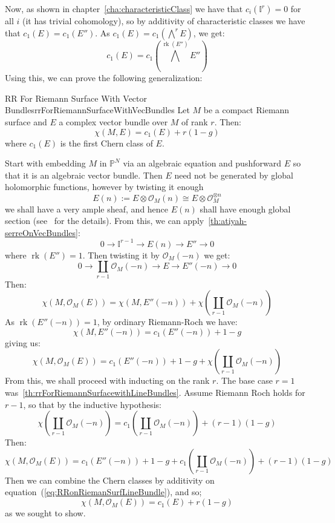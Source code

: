 \documentclass{ut-thesis}
\newenvironment{Proof}[1][]
  {\begin{ProofTcb}[#1]}
  {\end{ProofTcb}}
\newcommand{\BI}{{\mathbb{I}}}
\renewcommand{\P}{{\mathbb{P}}}
\newcommand{\CO}{{\mathcal{O}}}
\newcommand{\rk}{{\operatorname{rk}}}
\newcommand{\Dcup}{\coprod}
\begin{document}
Now, as shown in chapter~\ref{cha:characteristicClass} we have that $c_i(\BI^r) = 0$ for all $i$ (it has
trivial cohomology), so by additivity of
characteristic classes we have that $c_1(E) = c_1(E'')$. As $c_1(E) = c_1 \left(\bigwedge^r E\right)$, we get:
\[
  c_1(E) = c_1 \left(\bigwedge^{\rk(E'')}E''\right)
\]
Using this, we can prove the following generalization:

\begin{thm}{RR For Riemann Surface With Vector Bundles}{rrForRiemannSurfaceWithVecBundles}
  Let $M$ be a compact Riemann surface and $E$ a complex vector bundle over $M$ of rank $r$. Then:
  \[
    \chi(M, E) = c_1(E) + r(1-g)
  \]
  where $c_1(E)$ is the first Chern class of $E$.
\end{thm}

\begin{Proof}
  Start with embedding $M$ in $\P^N$ via an algebraic equation and pushforward $E$ so that it is an algebraic
  vector bundle. Then $E$ need not be generated by global holomorphic functions, however by twisting it enough
  \[
    E(n) := E\otimes \CO_M(n) \cong E\otimes \CO_M^{\otimes n}
  \]
  we shall have a very ample sheaf, and hence $E(n)$ shall have enough global section
  (see~\cite[section~4.4]{NateAlgGeo} for the details). From this, we can
  apply~\cref{th:atiyah-serreOnVecBundles}:
  \[
    0 \to \BI^{r-1} \to E(n) \to E'' \to 0
  \]
  where $\rk(E'') = 1$. Then twisting it by $\CO_M(-n)$ we get:
  \begin{equation}\label{eq:RRonRiemanSurfLineBundle}
    0 \to \Dcup_{r-1} \CO_M(-n) \to E \to E''(-n) \to 0
  \end{equation}
  Then:
  \[
    \chi(M, \CO_M(E)) = \chi(M, E''(-n)) + \chi \left( \Dcup_{r-1} \CO_M(-n)\right)
  \]
  As $\rk(E''(-n)) = 1$, by ordinary Riemann-Roch we have:
  \[
    \chi(M, E''(-n)) = c_1(E''(-n)) +1-g
  \]
  giving us:
  \[
    \chi(M, \CO_M(E)) = c_1(E''(-n)) +1-g  + \chi \left( \Dcup_{r-1} \CO_M(-n)\right)
  \]
  From this, we shall proceed with inducting on the rank $r$. The base case $r = 1$
  was~\cref{th:rrForRiemannSurfacewithLineBundles}. Assume Riemann Roch holds for $r-1$, so that by the
  inductive hypothesis:
  \[
    \chi \left( \Dcup_{r-1} \CO_M(-n)\right) = c_1 \left(\Dcup_{r-1} \CO_M(-n)\right) +(r-1)(1-g)
  \]
  Then:
  \[
    \chi(M, \CO_M(E)) = c_1(E''(-n)) +1-g  +c_1 \left(\Dcup_{r-1} \CO_M(-n)\right) +(r-1)(1-g)
  \]
  Then we can combine the Chern classes by additivity on equation~(\ref{eq:RRonRiemanSurfLineBundle}), and so;
  \[
    \chi(M, \CO_M(E)) = c_1(E) + r(1-g)
  \]
  as we sought to show.
\end{Proof}
\end{document}
